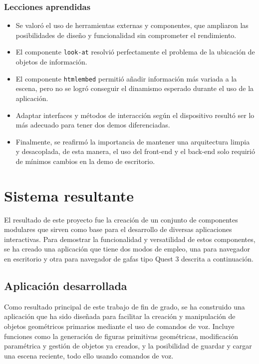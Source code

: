 \documentclass[a4paper, 12pt]{book}
\begin{document}
\subsection{Lecciones aprendidas}
\begin{itemize}
  \setlength\itemsep{0.3em}
\setlength\parskip{0pt}  
  \item Se valoró el uso de herramientas externas y componentes, que ampliaron las posibilidades de diseño y funcionalidad sin comprometer el rendimiento.
  \item El componente \texttt{look-at} resolvió perfectamente el problema de la ubicación de objetos de información.
  \item El componente \texttt{htmlembed} permitió añadir información más variada a la escena, pero no se logró conseguir el dinamismo esperado durante el uso de la aplicación.
  \item Adaptar interfaces y métodos de interacción según el dispositivo resultó ser lo más adecuado para tener dos demos diferenciadas.
  \item Finalmente, se reafirmó la importancia de mantener una arquitectura limpia y desacoplada, de esta manera, el uso del front-end y el back-end solo requirió de mínimos cambios en la demo de escritorio.
\end{itemize}


\chapter{Sistema resultante}
\label{chap:resultados}

El resultado de este proyecto fue la creación de un conjunto de componentes modulares que sirven como base para el desarrollo de diversas aplicaciones interactivas.
Para demostrar la funcionalidad y versatilidad de estos componentes, se ha creado una aplicación que tiene dos modos de empleo, una para navegador en escritorio y otra para navegador de gafas tipo Quest 3 descrita a continuación.

\section{Aplicación desarrollada}

Como resultado principal de este trabajo de fin de grado, se ha construido una aplicación
que ha sido diseñada para facilitar la creación y manipulación de objetos geométricos primarios mediante el uso de comandos de voz.
Incluye funciones como la generación de figuras primitivas geométricas, modificación paramétrica y gestión de objetos ya creados, y la posibilidad de guardar y cargar una escena reciente, todo ello usando comandos de voz.
\end{document}
